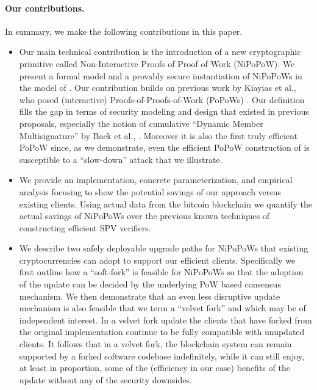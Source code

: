 \paragraph{Our contributions.}
In summary,  we make the following contributions in this paper. 
  \begin{itemize}
    \item Our main technical contribution is the introduction of 
    a new cryptographic
     primitive called Non-Interactive Proofs of Proof of Work (NiPoPoW). We present a formal model and a provably secure  
     instantiation of NiPoPoWs in the model of \cite{GKL15}. 
     Our contribution builds on previous work by  Kiayias et al., who posed
     (interactive) Proofs-of-Proofs-of-Work (PoPoWs) \cite{}. 
     Our definition fills the gap in terms of security modeling and design that existed in previous proposals, especially the notion of cumulative  ``Dynamic Member Multisignature'' by Back et al., \cite{}. Moreover it is also the first truly efficient PoPoW since, as we demonstrate, even the efficient PoPoW construction of \cite{KLS16} is susceptible to a ``slow-down'' attack that we illustrate. 
     
  \item We provide an implementation, concrete parameterization, and empirical analysis focusing to show the potential savings of our approach versus existing clients.
Using actual data from the bitcoin blockchain we quantify the actual savings of NiPoPoWs over 
the previous known techniques of constructing efficient SPV verifiers. 
   \item We describe two safely deployable upgrade paths for NiPoPoWs that existing cryptocurrencies can  adopt to support our efficient clients. Specifically
   we first outline how a ``soft-fork''  is feasible for NiPoPoWs so that the
   adoption of the update can be decided by the underlying PoW based consensus mechanism. We then demonstrate that an even less disruptive update mechanism is also feasible that we term a ``velvet fork'' and which may be of independent interest. In a velvet fork update the clients that have forked from the original implementation continue to be fully compatible with unupdated clients. It follows that in a velvet fork, the blockchain system can remain supported by a forked software codebase indefinitely, while it can still enjoy, at least in proportion, some of the (efficiency in our case) benefits of the update without any of the  security downsides.  
  \end{itemize}

